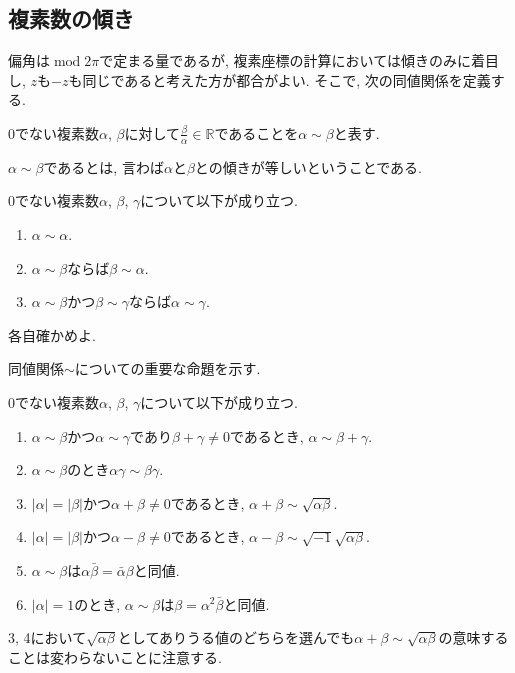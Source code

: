 \subsection{複素数の傾き}
偏角は$\operatorname{mod}2\pi$で定まる量であるが, 複素座標の計算においては傾きのみに着目し, $z$も$-z$も同じであると考えた方が都合がよい.
そこで, 次の同値関係を定義する.
\begin{bdef}
$0$でない複素数$\alpha$, $\beta$に対して$\frac\beta\alpha\in\mathbb{R}$であることを$\alpha\sim\beta$と表す.
\end{bdef}
$\alpha\sim\beta$であるとは, 言わば$\alpha$と$\beta$との傾きが等しいということである.
\begin{bprop}
$0$でない複素数$\alpha$, $\beta$, $\gamma$について以下が成り立つ.
\begin{enumerate}
\item $\alpha\sim\alpha$.
\item $\alpha\sim\beta$ならば$\beta\sim\alpha$.
\item $\alpha\sim\beta$かつ$\beta\sim\gamma$ならば$\alpha\sim\gamma$.
\end{enumerate}
\end{bprop}
\begin{prf*}
各自確かめよ.
\end{prf*}
同値関係$\sim$についての重要な命題を示す.
\begin{bprop}
$0$でない複素数$\alpha$, $\beta$, $\gamma$について以下が成り立つ.
\begin{enumerate}
\item $\alpha\sim\beta$かつ$\alpha\sim\gamma$であり$\beta+\gamma\neq 0$であるとき, $\alpha\sim\beta+\gamma$.
\item $\alpha\sim\beta$のとき$\alpha\gamma\sim\beta\gamma$.
\item $\lvert\alpha\rvert=\lvert\beta\rvert$かつ$\alpha+\beta\neq 0$であるとき, $\alpha+\beta\sim\sqrt{\alpha\beta}$.
\item $\lvert\alpha\rvert=\lvert\beta\rvert$かつ$\alpha-\beta\neq 0$であるとき, $\alpha-\beta\sim\sqrt{-1}\sqrt{\alpha\beta}$.
\item $\alpha\sim\beta$は$\alpha\bar\beta=\bar\alpha\beta$と同値.
\item $\lvert\alpha\rvert=1$のとき, $\alpha\sim\beta$は$\beta=\alpha^2\bar\beta$と同値.
\end{enumerate}
\end{bprop}
\begin{note}
3, 4において$\sqrt{\alpha\beta}$としてありうる値のどちらを選んでも$\alpha+\beta\sim\sqrt{\alpha\beta}$の意味することは変わらないことに注意する.
\end{note}

